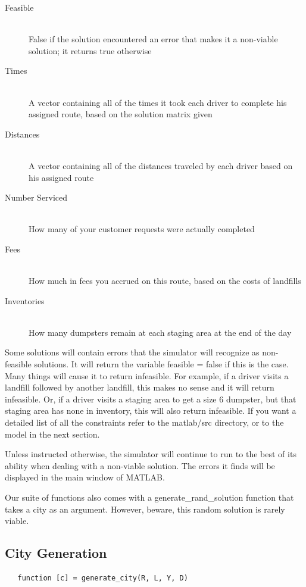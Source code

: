 \documentclass{article}
\begin{document}
\begin{description}
\item[Feasible ]\hfill \\  False if the solution encountered an error that makes it a non-viable solution; it returns true otherwise
\item[Times ] \hfill \\ A vector containing all of the times it took each driver to complete his assigned route, based on the solution matrix given
\item[Distances ] \hfill \\ A vector containing all of the distances traveled by each driver based on his assigned route
\item[Number Serviced ] \hfill \\ How many of your customer requests were actually completed
\item[Fees ] \hfill \\ How much in fees you accrued on this route, based on the costs of landfills
\item[Inventories]\hfill \\  How many dumpsters remain at each staging area at the end of the day
\end{description}

Some solutions will contain errors that the simulator will recognize as non-feasible solutions. 
It will return the variable feasible = false if this is the case. 
Many things will cause it to return infeasible.
For example, if a driver visits a landfill followed by another landfill, this makes no sense and it will return infeasible.  
Or, if a driver visits a staging area to get a size 6 dumpster, but that staging area has none in inventory, this will also return infeasible.
If you want a detailed list of all the constraints refer to the matlab/src directory, or to the model in the next section.


Unless instructed otherwise, the simulator will continue to run to the best of its ability when dealing with a non-viable solution.
The errors it finds will be displayed in the main window of MATLAB.

Our suite of functions also comes with a generate\_rand\_solution function that takes a city as an argument.
However, beware, this random solution is rarely viable.



\subsection{City Generation}
\begin{verbatim}
   function [c] = generate_city(R, L, Y, D)
\end{verbatim}
\end{document}
